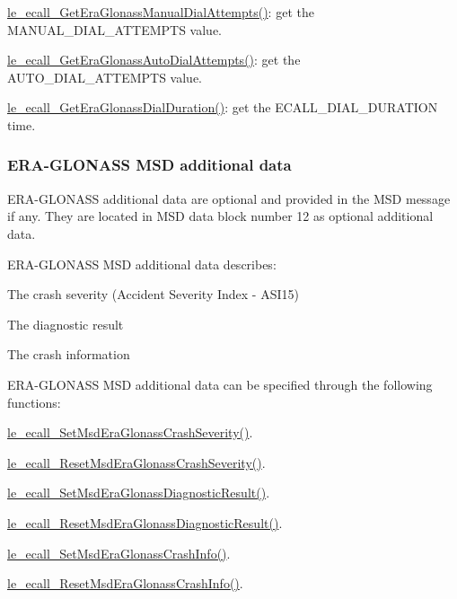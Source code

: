 \begin{DoxyItemize}
\item \hyperlink{le__ecall__interface_8h_a579169dbcb91369caa156d2c0e3462c1}{le\+\_\+ecall\+\_\+\+Get\+Era\+Glonass\+Manual\+Dial\+Attempts()}\+: get the M\+A\+N\+U\+A\+L\+\_\+\+D\+I\+A\+L\+\_\+\+A\+T\+T\+E\+M\+P\+T\+S value.
\item \hyperlink{le__ecall__interface_8h_af8beed56bd3be9bee8a771e05c498ac8}{le\+\_\+ecall\+\_\+\+Get\+Era\+Glonass\+Auto\+Dial\+Attempts()}\+: get the A\+U\+T\+O\+\_\+\+D\+I\+A\+L\+\_\+\+A\+T\+T\+E\+M\+P\+T\+S value.
\item \hyperlink{le__ecall__interface_8h_afeb92d26dd8a2c092e96b07f3dc0391d}{le\+\_\+ecall\+\_\+\+Get\+Era\+Glonass\+Dial\+Duration()}\+: get the E\+C\+A\+L\+L\+\_\+\+D\+I\+A\+L\+\_\+\+D\+U\+R\+A\+T\+I\+O\+N time.
\end{DoxyItemize}\hypertarget{c_ecall_le_ecall_eraGlonassData}{}\subsubsection{E\+R\+A-\/\+G\+L\+O\+N\+A\+S\+S M\+S\+D additional data}\label{c_ecall_le_ecall_eraGlonassData}
E\+R\+A-\/\+G\+L\+O\+N\+A\+S\+S additional data are optional and provided in the M\+S\+D message if any. They are located in M\+S\+D data block number 12 as optional additional data.

E\+R\+A-\/\+G\+L\+O\+N\+A\+S\+S M\+S\+D additional data describes\+:
\begin{DoxyItemize}
\item The crash severity (Accident Severity Index -\/ A\+S\+I15)
\item The diagnostic result
\item The crash information
\end{DoxyItemize}

E\+R\+A-\/\+G\+L\+O\+N\+A\+S\+S M\+S\+D additional data can be specified through the following functions\+:
\begin{DoxyItemize}
\item \hyperlink{le__ecall__interface_8h_a577f3dcd16e53c8a14295ec58c6d2b9a}{le\+\_\+ecall\+\_\+\+Set\+Msd\+Era\+Glonass\+Crash\+Severity()}.
\item \hyperlink{le__ecall__interface_8h_addb2874aacaffba2731354c4ac9428bf}{le\+\_\+ecall\+\_\+\+Reset\+Msd\+Era\+Glonass\+Crash\+Severity()}.
\item \hyperlink{le__ecall__interface_8h_a51ad61edf379cfe07f03fbd71b56df9d}{le\+\_\+ecall\+\_\+\+Set\+Msd\+Era\+Glonass\+Diagnostic\+Result()}.
\item \hyperlink{le__ecall__interface_8h_ad3e06b90843a480d68dc99ead29ae8d0}{le\+\_\+ecall\+\_\+\+Reset\+Msd\+Era\+Glonass\+Diagnostic\+Result()}.
\item \hyperlink{le__ecall__interface_8h_a08c613df57d34eb2a1309738bced5d76}{le\+\_\+ecall\+\_\+\+Set\+Msd\+Era\+Glonass\+Crash\+Info()}.
\item \hyperlink{le__ecall__interface_8h_ab883aa41416ada9746acfbb75a0039a8}{le\+\_\+ecall\+\_\+\+Reset\+Msd\+Era\+Glonass\+Crash\+Info()}.
\end{DoxyItemize}

